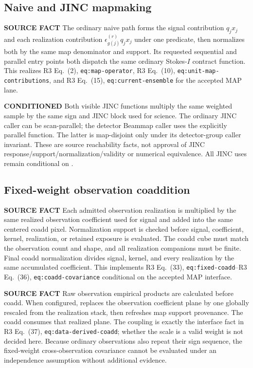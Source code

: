 \documentclass[10pt]{article}
\newcommand{\srclabel}{\textbf{SOURCE FACT}}
\newcommand{\conditionedlabel}{\textbf{CONDITIONED}}
\newcommand{\rthree}[2]{R3 Eq.~(#1), \texttt{#2}}
\begin{document}
\subsection{Naive and JINC mapmaking}

\srclabel{} The ordinary naive path forms the signal contribution
$q_jx_j$ and each realization contribution $\epsilon^{(r)}_{g(j)}q_jx_j$
under one predicate, then normalizes both by the same map denominator and
support.  Its requested sequential and parallel entry points both dispatch
the same ordinary Stokes-$I$ contract function.  This realizes
\rthree{2}{eq:map-operator}, \rthree{10}{eq:unit-map-contributions}, and
\rthree{15}{eq:current-ensemble} for the accepted MAP lane.

\conditionedlabel{} Both visible JINC functions multiply the same weighted
sample by the same sign and JINC block used for science.  The ordinary JINC
caller can be scan-parallel; the detector Beammap caller uses the explicitly
parallel function.  The latter is map-disjoint only under its detector-group
caller invariant.  These are source reachability facts, not approval of JINC
response/support/normalization/validity or numerical equivalence.  All JINC
uses remain conditional on .

\subsection{Fixed-weight observation coaddition}

\srclabel{} Each admitted observation realization is multiplied by the same
realized observation coefficient used for signal and added into the same
centered coadd pixel.  Normalization support is checked before signal,
coefficient, kernel, realization, or retained exposure is evaluated.  The
coadd cube must match the observation count and shape, and all realization
companions must be finite.  Final coadd normalization divides signal, kernel,
and every realization by the same accumulated coefficient.  This implements
\rthree{33}{eq:fixed-coadd}--\rthree{36}{eq:coadd-covariance} conditional on
the accepted MAP interface.

\srclabel{} Raw observation empirical products are calculated before coadd.
When configured,  replaces the observation
coefficient plane by one globally rescaled from the realization stack, then
refreshes map support provenance.  The coadd consumes that realized plane.
The coupling is exactly the interface fact in
\rthree{37}{eq:data-derived-coadd}; whether the scale is a valid weight is not
decided here.  Because ordinary observations also repeat their sign sequence,
the fixed-weight cross-observation covariance cannot be evaluated under an
independence assumption without additional evidence.
\end{document}

